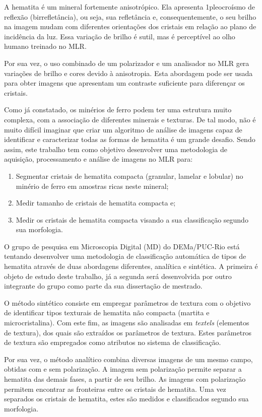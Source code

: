 A hematita é um mineral fortemente anisotrópico. Ela apresenta
1pleocroísmo de reflexão (birrefletância), ou seja, sua refletância e,
consequentemente, o seu brilho na imagem mudam com diferentes
orientações dos cristais em relação ao plano de incidência da
luz.\cite{5} Essa variação de brilho é sutil, mas é perceptível ao
olho humano treinado no MLR.

Por sua vez, o uso combinado de um polarizador e um analisador no MLR
gera variações de brilho e cores devido à anisotropia.\cite{13} Esta
abordagem pode ser usada para obter imagens que apresentam um
contraste suficiente para diferençar os cristais.

Como já constatado, os minérios de ferro podem ter uma estrutura muito
complexa, com a associação de diferentes minerais e texturas. De tal
modo, não é muito difícil imaginar que criar um algoritmo de análise
de imagens capaz de identificar e caracterizar todas as formas de
hematita é um grande desafio. Sendo assim, este trabalho tem como
objetivo desenvolver uma metodologia de aquisição, processamento e
análise de imagens no MLR para:

\begin{enumerate}[label=(\roman{*})]
  \item Segmentar cristais de hematita compacta (granular, lamelar e
    lobular) no minério de ferro em amostras ricas neste mineral;
  \item Medir tamanho de cristais de hematita compacta e;  
  \item Medir os cristais de hematita compacta visando a sua
    classificação segundo sua morfologia.
\end{enumerate}

O grupo de pesquisa em Microscopia Digital (MD) do DEMa/PUC-Rio está
tentando desenvolver uma metodologia de classificação automática de
tipos de hematita através de duas abordagens diferentes, analítica e
sintética. A primeira é objeto de estudo deste trabalho, já a segunda
será desenvolvida por outro integrante do grupo como parte da sua
dissertação de mestrado.

O método sintético consiste em empregar parâmetros de textura com o
objetivo de identificar tipos texturais de hematita não compacta
(martita e microcristalina). Com este fim, as imagens são analisadas
em \textit{textels} (elementos de textura), dos quais são extraídos os
parâmetros de textura. Estes parâmetros de textura são empregados como
atributos no sistema de classificação.

Por sua vez, o método analítico combina diversas imagens de um mesmo
campo, obtidas com e sem polarização. A imagem sem polarização permite
separar a hematita das demais fases, a partir de seu brilho. As
imagens com polarização permitem encontrar as fronteiras entre os
cristais de hematita. Uma vez separados os cristais de hematita, estes
são medidos e classificados segundo sua morfologia.\cite{2,13}

